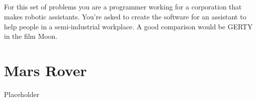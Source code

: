 \documentclass[11pt]{book}
\begin{document}
\paragraph{} For this set of problems you are a programmer working for a
corporation that makes robotic assistants. You're asked to create the software
for an assistant to help people in a semi-industrial workplace. A good
comparison would be GERTY in the film Moon.

\clearpage


\chapter{Mars Rover}

Placeholder

\paragraph{}

\clearpage



\clearpage

\end{document}
